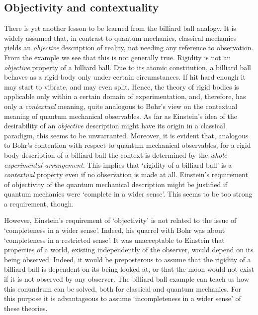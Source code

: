 \documentclass[12pt]{article}
\begin{document}
\subsection{Objectivity and contextuality}\label{sec2.1.2}
There is yet another lesson to be learned from the billiard ball
analogy. It is widely assumed that, in contrast to quantum
mechanics, classical mechanics yields an {\em objective}
description of reality, not needing any reference to observation.
From the example we see that this is not generally true. Rigidity
is not an {\em objective} property of a billiard ball. Due to its
atomic constitution, a billiard ball behaves as a rigid body only
under certain circumstances. If hit hard enough it may start to
vibrate, and may even split. Hence, the theory of rigid bodies is
applicable only within a certain domain of experimentation, and,
therefore, has only a {\em contextual} meaning, quite analogous to
Bohr's view on the contextual meaning of quantum mechanical
observables. As far as Einstein's idea of the desirability of an
{\em objective} description might have its origin in a classical
paradigm, this seems to be unwarranted. Moreover, it is evident
that, analogous to Bohr's contention with respect to quantum
mechanical observables, for a rigid body description of a billiard
ball the context is determined by the {\em whole experimental
arrangement}. This implies that `rigidity of a billiard ball' is a
{\em contextual} property even if no observation is made at all.
Einstein's requirement of objectivity of the quantum mechanical
description might be justified if quantum mechanics were `complete
in a wider sense'. This seems to be too strong a requirement,
though.

However, Einstein's requirement of `objectivity' is not related to
the issue of `completeness in a wider sense'. Indeed, his quarrel
with Bohr was about `completeness in a restricted sense'. It was
unacceptable to Einstein that properties of a world, existing
independently of the observer, would depend on its being observed.
Indeed, it would be preposterous to assume that the rigidity of a
billiard ball is dependent on its being looked at, or that the
moon would not exist if it is not observed by any observer.
The billiard ball example can teach us how this conundrum can be
solved, both for classical and quantum mechanics. For this purpose
it is advantageous to assume `incompleteness in a wider sense' of
these theories.
\end{document}
